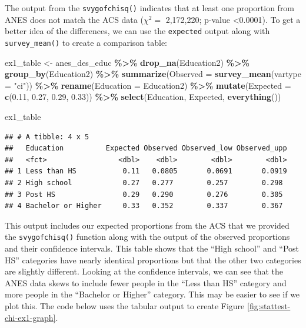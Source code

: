\documentclass[
]{krantz}
\makeatletter
\newenvironment{Shaded}{\begin{snugshade}}{\end{snugshade}}
\newcommand{\AttributeTok}[1]{\textcolor[rgb]{0.27,0.27,0.27}{#1}}
\newcommand{\FloatTok}[1]{\textcolor[rgb]{0.06,0.06,0.06}{#1}}
\newcommand{\FunctionTok}[1]{\textcolor[rgb]{0.27,0.27,0.27}{\textbf{#1}}}
\newcommand{\NormalTok}[1]{#1}
\newcommand{\OtherTok}[1]{\textcolor[rgb]{0.37,0.37,0.37}{#1}}
\newcommand{\SpecialCharTok}[1]{\textcolor[rgb]{0.43,0.43,0.43}{\textbf{#1}}}
\newcommand{\StringTok}[1]{\textcolor[rgb]{0.5,0.5,0.5}{#1}}
\newenvironment{kframe}{%
\medskip{}
\setlength{\fboxsep}{.8em}
 \def\at@end@of@kframe{}%
 \ifinner\ifhmode%
  \def\at@end@of@kframe{\end{minipage}}%
  \begin{minipage}{\columnwidth}%
 \fi\fi%
 \def\FrameCommand##1{\hskip\@totalleftmargin \hskip-\fboxsep
 \colorbox{shadecolor}{##1}\hskip-\fboxsep
     \hskip-\linewidth \hskip-\@totalleftmargin \hskip\columnwidth}%
 \MakeFramed {\advance\hsize-\width
   \@totalleftmargin\z@ \linewidth\hsize
   \@setminipage}}%
 {\par\unskip\endMakeFramed%
 \at@end@of@kframe}
\renewenvironment{Shaded}{\begin{kframe}}{\end{kframe}}
\makeatother
\begin{document}
The output from the \texttt{svygofchisq()} indicates that at least one proportion from ANES does not match the ACS data (\(\chi^2 =\) 2,172,220; p-value \textless0.0001). To get a better idea of the differences, we can use the \texttt{expected} output along with \texttt{survey\_mean()} to create a comparison table:

\begin{Shaded}
\begin{Highlighting}[]
\NormalTok{ex1\_table }\OtherTok{\textless{}{-}}\NormalTok{ anes\_des\_educ }\SpecialCharTok{\%\textgreater{}\%}
  \FunctionTok{drop\_na}\NormalTok{(Education2) }\SpecialCharTok{\%\textgreater{}\%}
  \FunctionTok{group\_by}\NormalTok{(Education2) }\SpecialCharTok{\%\textgreater{}\%}
  \FunctionTok{summarize}\NormalTok{(}\AttributeTok{Observed =} \FunctionTok{survey\_mean}\NormalTok{(}\AttributeTok{vartype =} \StringTok{"ci"}\NormalTok{)) }\SpecialCharTok{\%\textgreater{}\%}
  \FunctionTok{rename}\NormalTok{(}\AttributeTok{Education =}\NormalTok{ Education2) }\SpecialCharTok{\%\textgreater{}\%}
  \FunctionTok{mutate}\NormalTok{(}\AttributeTok{Expected =} \FunctionTok{c}\NormalTok{(}\FloatTok{0.11}\NormalTok{, }\FloatTok{0.27}\NormalTok{, }\FloatTok{0.29}\NormalTok{, }\FloatTok{0.33}\NormalTok{)) }\SpecialCharTok{\%\textgreater{}\%}
  \FunctionTok{select}\NormalTok{(Education, Expected, }\FunctionTok{everything}\NormalTok{())}

\NormalTok{ex1\_table}
\end{Highlighting}
\end{Shaded}

\begin{verbatim}
## # A tibble: 4 x 5
##   Education          Expected Observed Observed_low Observed_upp
##   <fct>                 <dbl>    <dbl>        <dbl>        <dbl>
## 1 Less than HS           0.11   0.0805       0.0691       0.0919
## 2 High school            0.27   0.277        0.257        0.298 
## 3 Post HS                0.29   0.290        0.276        0.305 
## 4 Bachelor or Higher     0.33   0.352        0.337        0.367
\end{verbatim}

This output includes our expected proportions from the ACS that we provided the \texttt{svygofchisq()} function along with the output of the observed proportions and their confidence intervals. This table shows that the ``High school'' and ``Post HS'' categories have nearly identical proportions but that the other two categories are slightly different. Looking at the confidence intervals, we can see that the ANES data skews to include fewer people in the ``Less than HS'' category and more people in the ``Bachelor or Higher'' category. This may be easier to see if we plot this. The code below uses the tabular output to create Figure \ref{fig:stattest-chi-ex1-graph}.
\end{document}
